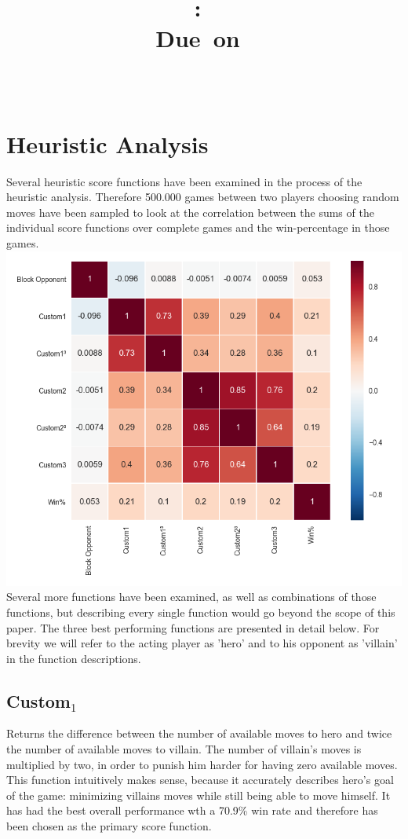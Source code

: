 \documentclass{article}
\title{
\vspace{2in}
\textmd{\textbf{\courseName:\ \pageTitle}}\\
\normalsize\vspace{0.1in}\small{Due\ on\ \hmwkDueDate}\\
\vspace{0.1in}\large{\textit{\hmwkClassInstructor\ \hmwkClassTime}}
\vspace{3in}
}
\author{\textbf{\authorName}}
\date{} %
\begin{document}
\section{Heuristic Analysis}
Several heuristic score functions have been examined in the process of the heuristic
analysis. Therefore 500.000 games between two players choosing random moves have been
sampled to look at the correlation between the sums of the individual score functions
over complete games and the win-percentage in those games.
\includegraphics[width=\textwidth]{./correlation.png}
Several more functions have been examined, as well as combinations of those functions,
but describing every single function would go beyond the scope of this paper.
The three best performing functions are presented in detail below. For brevity we will refer
to the acting player as 'hero' and to his opponent as 'villain' in the function
descriptions.

\subsection{Custom$_1$}
Returns the difference between the number of available moves to hero and twice the
number of available moves to villain. The number of villain's moves is multiplied
by two, in order to punish him harder for having zero available moves. This function
intuitively makes sense, because it accurately describes hero's goal of the game: minimizing
villains moves while still being able to move himself. It has had the best overall
performance wth a 70.9\% win rate and therefore has been chosen as the primary score function.
\end{document}
